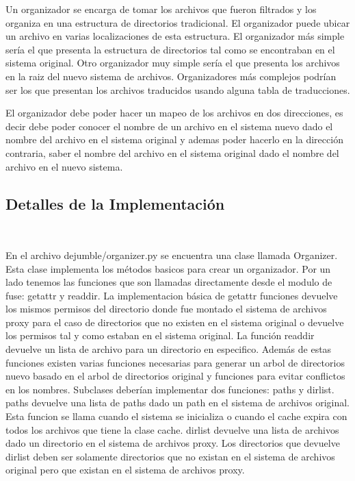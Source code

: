 Un organizador se encarga de tomar los archivos que fueron filtrados y los organiza en una estructura de directorios tradicional. El organizador puede ubicar un archivo en varias localizaciones de esta estructura. El organizador más simple sería el que presenta la estructura de directorios tal como se encontraban en el sistema original. Otro organizador muy simple sería el que presenta los archivos en la raiz del nuevo sistema de archivos. Organizadores más complejos podrían ser los que presentan los archivos traducidos usando alguna tabla de traducciones.

El organizador debe poder hacer un mapeo de los archivos en dos direcciones, es decir debe poder conocer el nombre de un archivo en el sistema nuevo dado el nombre del archivo en el sistema original y ademas poder hacerlo en la dirección contraria, saber el nombre del archivo en el sistema original dado el nombre del archivo en el nuevo sistema.

\subsection{Detalles de la Implementación}
\label{detalles_organizador}

En el archivo dejumble/organizer.py se encuentra una clase llamada Organizer. Esta clase implementa los métodos basicos para crear un organizador. Por un lado tenemos las funciones que son llamadas directamente desde el modulo de fuse: getattr y readdir. La implementacion básica de getattr funciones devuelve los mismos permisos del directorio donde fue montado el sistema de archivos proxy para el caso de directorios que no existen en el sistema original o devuelve los permisos tal y como estaban en el sistema original. La función readdir devuelve un lista de archivo para un directorio en especifico. Además de estas funciones existen varias funciones necesarias para generar un arbol de directorios nuevo basado en el arbol de directorios original y funciones para evitar conflictos en los nombres. Subclases deberían implementar dos funciones: paths y dirlist. paths devuelve una lista de paths dado un path en el sistema de archivos original. Esta funcion se llama cuando el sistema se inicializa o cuando el cache expira con todos los archivos que tiene la clase cache. dirlist devuelve una lista de archivos dado un directorio en el sistema de archivos proxy. Los directorios que devuelve dirlist deben ser solamente directorios que no existan en el sistema de archivos original pero que existan en el sistema de archivos proxy.


